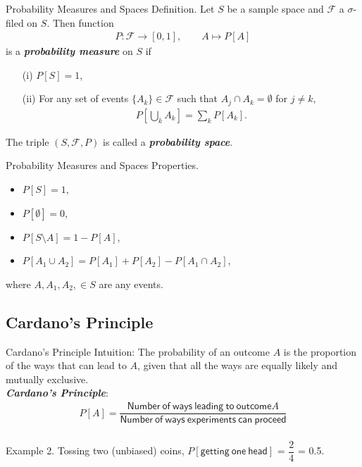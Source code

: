 \documentclass[hyperref={pdfpagelabels=false}]{beamer}
\newcommand{\U}{\mathsf}
\newcommand{\highlightg}[1]{\textcolor[rgb]{0.1,0.5,0.3}{\emph{\textbf{#1}}}}
\newcommand{\structb}[1]{\textcolor[rgb]{0.2,0.2,0.7}{#1}}
\begin{document}
%
\begin{frame}{Probability Measures and Spaces}
    \justifying
    \structb{Definition.} Let $S$ be a sample space and $\mathcal{F}$ a $\sigma$-filed on $S$. Then function
    \begin{align*}
        P: \mathcal{F} \rightarrow [0, 1], \qquad A\mapsto P[A]
    \end{align*}
    is a \highlightg{probability measure} on $S$ if
    \begin{enumerate}
    	\justifying
    	\item[(i)] $P[S] = 1$,
    	\item[(ii)] For any set of events $\{A_k\} \in \mathcal{F}$ such that $A_j\cap A_k = \emptyset$ for $j\neq k$,
    	\begin{align*}
    	    P\left[\underset{k}{\bigcup}A_k \right] = \sum_k P[A_k].
    	\end{align*}
    \end{enumerate}
    The triple $(S, \mathcal{F}, P)$ is called a \highlightg{probability space}.
\end{frame}
%
\begin{frame}{Probability Measures and Spaces}
    \justifying
    \structb{Properties.} 
    \begin{itemize}
    	\justifying
    	\item $P[S] = 1$,
    	\item $P[\emptyset] = 0$,
    	\item $P[S\setminus A] = 1 - P[A]$,
    	\item $P[A_1\cup A_2] = P[A_1] + P[A_2] - P[A_1\cap A_2]$,
    \end{itemize}
    where $A, A_1, A_2, \in S$ are any events.
\end{frame}
%
\subsection{Cardano's Principle}
\begin{frame}{Cardano's Principle}
    \justifying
    \structb{Intuition}: The probability of an outcome $A$ is the proportion of the ways that can lead to $A$, given that all the ways are equally likely and mutually exclusive.
    ~\\
    \highlightg{Cardano's Principle}:
    \begin{align*}
        P[A] = \dfrac{\U{Number\ of\ ways\ leading\ to\ outcome} A}{\U{Number\ of\ ways\ experiments\ can\ proceed}}
    \end{align*}
    ~\\
    \structb{Example 2.} Tossing two (unbiased) coins, $P[\U{getting\ one\ head}]$ \pause = $\dfrac{2}{4}$ = 0.5.
\end{frame}
%
\end{document}

